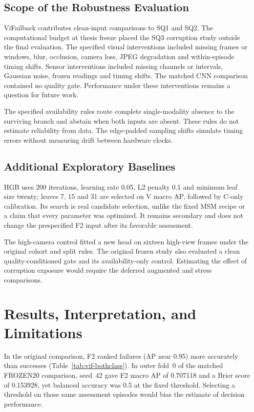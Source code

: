 \subsection{Scope of the Robustness Evaluation}
ViFailback contributes clean-input comparisons to SQ1 and SQ2. The computational budget at thesis freeze placed the SQ3 corruption study outside the final evaluation. The specified visual interventions included missing frames or windows, blur, occlusion, camera loss, JPEG degradation and within-episode timing shifts. Sensor interventions included missing channels or intervals, Gaussian noise, frozen readings and timing shifts. The matched CNN comparison contained no quality gate. Performance under these interventions remains a question for future work.

The specified availability rules route complete single-modality absence to the surviving branch and abstain when both inputs are absent. These rules do not estimate reliability from data. The edge-padded sampling shifts simulate timing errors without measuring drift between hardware clocks.

\subsection{Additional Exploratory Baselines}
HGB uses 200 iterations, learning rate 0.05, L2 penalty 0.1 and minimum leaf size twenty; leaves 7, 15 and 31 are selected on V macro AP, followed by C-only calibration. Its search is real candidate selection, unlike the fixed MSM recipe or a claim that every parameter was optimized. It remains secondary and does not change the prespecified F2 input after its favorable assessment.

The high-camera control fitted a new head on sixteen high-view frames under the original cohort and split rules. The original frozen study also evaluated a clean quality-conditioned gate and its availability-only control. Estimating the effect of corruption exposure would require the deferred augmented and stress comparisons.

\section{Results, Interpretation, and Limitations}
In the original comparison, F2 ranked failures (AP near 0.95) more accurately than successes (Table~\ref{tab:vif-bothclass}). In outer fold~0 of the matched FROZEN20 comparison, seed~42 gave F2 macro AP of 0.707118 and a Brier score of 0.153928, yet balanced accuracy was 0.5 at the fixed threshold. Selecting a threshold on those same assessment episodes would bias the estimate of decision performance.

